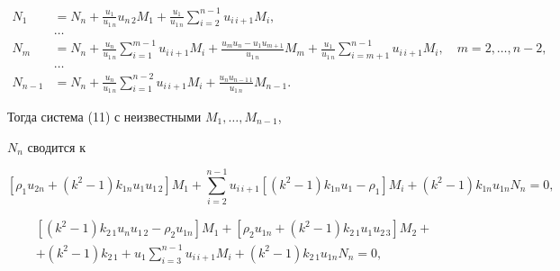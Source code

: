\begin{equation}


\begin{split}


N_1&=N_n+\frac{u_1}{u_{1\,n}}u_{n\,2}M_1+\frac{u_1}{u_{1\,n}}


\sum^{n-1}_{i=2}u_{i\,i+1}M_i,\\


&\dots\\


N_m&=N_n+\frac{u_n}{u_{1\,n}}\sum^{m-1}_{i=1}u_{i\,i+1}


M_i+


\frac{u_mu_n-u_1u_{m+1}}{u_{1\,n}}M_m


+\frac{u_1}{u_{1\,n}}\sum^{n-1}_{i=m+1}u_{i\,i+1}M_i,\quad


m=2,\dotsc,n-2,\\


&\dots\\


N_{n-1}&=N_n+\frac{u_n}{u_{1\,n}}\sum^{n-2}_{i=1}u_{i\,i+1}M_i+


\frac{u_nu_{n-1\,1}}{u_{1\,n}}M_{n-1}.


\end{split}


\end{equation}


Тогда система (11) с неизвестными $M_1,\dotsc,M_{n-1}$,


$N_n$ сводится к


\begin{equation*}


[\rho_1u_{2n}+(k^2-1)k_{1n}u_1u_{1\,2}]M_1+


\sum^{n-1}_{i=2}u_{i\,i+1}


[(k^2-1)k_{1n}u_1-\rho_1]M_i+


(k^2-1)k_{1n}u_{1n}N_n=0, \tag{17.1}


\end{equation*}


\begin{multline}


[(k^2-1)k_{2\,1}u_nu_{1\,2}-\rho_2u_{1n}]M_1+


[\rho_2u_{1n}+(k^2-1)k_{2\,1}u_1u_{2\,3}]M_2+\\


+(k^2-1)k_{2\,1}+u_1\sum^{n-1}_{i=3}u_{i\,i+1}M_i


+(k^2-1)k_{2\,1}u_{1n}N_n=0,


\tag{17.2}


\end{multline}


